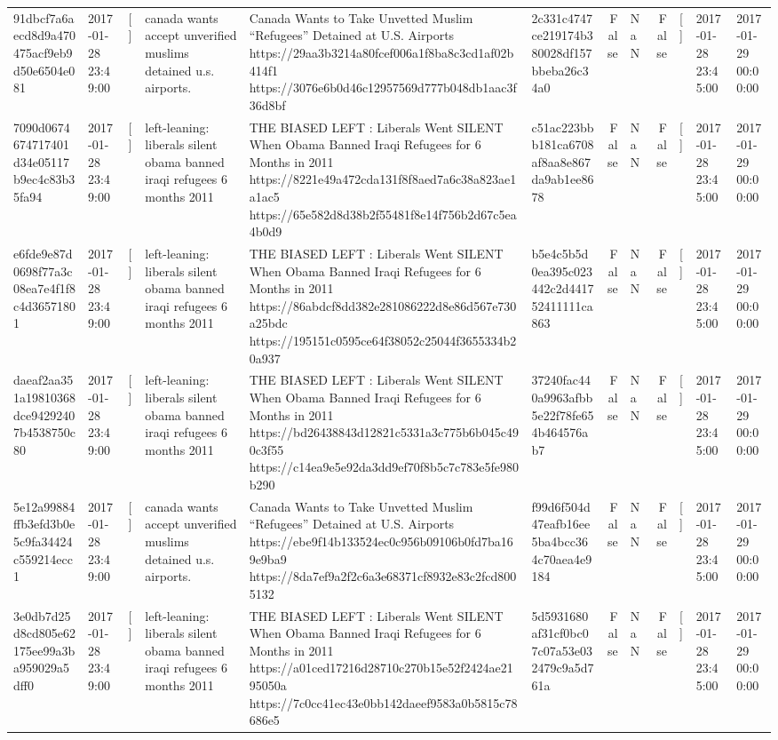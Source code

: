 \begin{tabular}{llllllrlrlll}
91dbcf7a6aecd8d9a470475acf9eb9d50e6504e081 & 2017-01-28 23:49:00 & [] & canada wants accept unverified muslims detained u.s. airports. & Canada Wants to Take Unvetted Muslim “Refugees” Detained at U.S. Airports https://29aa3b3214a80fcef006a1f8ba8c3cd1af02b414f1 https://3076e6b0d46c12957569d777b048db1aac3f36d8bf & 2c331c4747ce219174b380028df157bbeba26c34a0 & False & NaN & False & [] & 2017-01-28 23:45:00 & 2017-01-29 00:00:00 \\
7090d0674674717401d34e05117b9ec4c83b35fa94 & 2017-01-28 23:49:00 & [] & left-leaning: liberals silent obama banned iraqi refugees 6 months 2011 & THE BIASED LEFT : Liberals Went SILENT When Obama Banned Iraqi Refugees for 6 Months in 2011 https://8221e49a472cda131f8f8aed7a6c38a823ae1a1ac5 https://65e582d8d38b2f55481f8e14f756b2d67c5ea4b0d9 & c51ac223bbb181ca6708af8aa8e867da9ab1ee8678 & False & NaN & False & [] & 2017-01-28 23:45:00 & 2017-01-29 00:00:00 \\
e6fde9e87d0698f77a3c08ea7e4f1f8c4d36571801 & 2017-01-28 23:49:00 & [] & left-leaning: liberals silent obama banned iraqi refugees 6 months 2011 & THE BIASED LEFT : Liberals Went SILENT When Obama Banned Iraqi Refugees for 6 Months in 2011 https://86abdcf8dd382e281086222d8e86d567e730a25bdc https://195151c0595ce64f38052c25044f3655334b20a937 & b5e4c5b5d0ea395c023442c2d441752411111ca863 & False & NaN & False & [] & 2017-01-28 23:45:00 & 2017-01-29 00:00:00 \\
daeaf2aa351a19810368dce94292407b4538750c80 & 2017-01-28 23:49:00 & [] & left-leaning: liberals silent obama banned iraqi refugees 6 months 2011 & THE BIASED LEFT : Liberals Went SILENT When Obama Banned Iraqi Refugees for 6 Months in 2011 https://bd26438843d12821c5331a3c775b6b045c490c3f55 https://c14ea9e5e92da3dd9ef70f8b5c7c783e5fe980b290 & 37240fac440a9963afbb5e22f78fe654b464576ab7 & False & NaN & False & [] & 2017-01-28 23:45:00 & 2017-01-29 00:00:00 \\
5e12a99884ffb3efd3b0e5c9fa34424c559214ecc1 & 2017-01-28 23:49:00 & [] & canada wants accept unverified muslims detained u.s. airports. & Canada Wants to Take Unvetted Muslim “Refugees” Detained at U.S. Airports https://ebe9f14b133524ec0c956b09106b0fd7ba169e9ba9 https://8da7ef9a2f2c6a3e68371cf8932e83c2fcd8005132 & f99d6f504d47eafb16ee5ba4bcc364c70aea4e9184 & False & NaN & False & [] & 2017-01-28 23:45:00 & 2017-01-29 00:00:00 \\
3e0db7d25d8cd805e62175ee99a3ba959029a5dff0 & 2017-01-28 23:49:00 & [] & left-leaning: liberals silent obama banned iraqi refugees 6 months 2011 & THE BIASED LEFT : Liberals Went SILENT When Obama Banned Iraqi Refugees for 6 Months in 2011 https://a01ced17216d28710c270b15e52f2424ae2195050a https://7c0cc41ec43e0bb142daeef9583a0b5815c78686e5 & 5d5931680af31cf0bc07c07a53e032479c9a5d761a & False & NaN & False & [] & 2017-01-28 23:45:00 & 2017-01-29 00:00:00 \\

\end{tabular}
